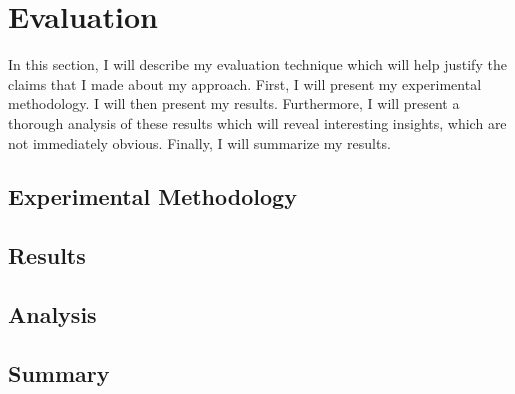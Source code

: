 \section{Evaluation}
\label{sec:evaluation}

In this section, I will describe my evaluation technique
which will help justify the claims that I made about my 
approach. First, I will present my experimental methodology. 
I will then present my results. Furthermore, I will 
present a thorough analysis of these results which will 
reveal interesting insights, which are not immediately 
obvious. Finally, I will summarize my results. 

\subsection{Experimental Methodology}



\subsection{Results}




\subsection{Analysis}




\subsection{Summary}




